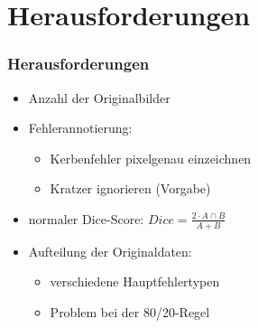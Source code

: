 \documentclass{beamer}
\begin{document}
\section{Herausforderungen}
\begin{frame}
\frametitle{Herausforderungen}
\begin{itemize}
    \item Anzahl der Originalbilder
    \item Fehlerannotierung:
    \begin{itemize}
        \item Kerbenfehler pixelgenau einzeichnen
        \item Kratzer ignorieren (Vorgabe)
    \end{itemize}
    \item normaler Dice-Score:
    $Dice = \frac{2 \cdot A \cap B}{A + B}$ 
    \item Aufteilung der Originaldaten:
    \begin{itemize}
        \item verschiedene Hauptfehlertypen
        \item Problem bei der 80/20-Regel
    \end{itemize}
\end{itemize}
\end{frame}
\end{document}

